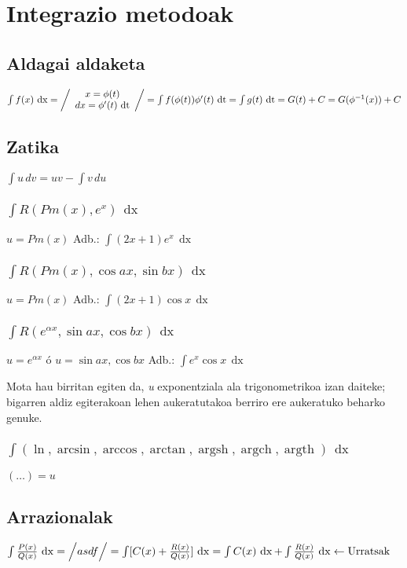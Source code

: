 \documentclass[8pt]{article}
\DeclareMathOperator{\xder}{\, \mathrm{d}x}
\DeclareMathOperator{\tder}{\, \mathrm{d}t}
\DeclareMathOperator{\argsh}{argsh}
\DeclareMathOperator{\argch}{argch}
\DeclareMathOperator{\argth}{argth}
\begin{document}
	\section{Integrazio metodoak}
		\subsection{Aldagai aldaketa}
			$ \int f(x) \xder = \left/
				\begin{array}{c}
					x = \phi (t) \\
					dx = \phi'(t) \tder
				\end{array}
				\right/
				= \int f(\phi(t)) \phi' (t) \tder =
				\int g(t) \tder = G (t) + C = G (\phi^{-1} (x)) + C
			$
		\subsection{Zatika}
			$ \int u \, dv = uv - \int v \, du $

			\subsubsection{$ \int R (Pm(x), e^x) \xder$}
				$ u = Pm(x) $ \quad 
				Adb.: $ \int (2x + 1) e^x \xder $
			\subsubsection{$ \int R (Pm(x), \cos ax, \sin bx) \xder $}
				$ u = Pm(x) $ \quad
				Adb.: $ \int (2x + 1) \cos x \xder $
			\subsubsection{$ \int R (e^{\alpha x}, \sin ax, \cos bx) \xder $}
				$ u = e^{\alpha x} $ ó $ u = \sin ax, \cos bx $ \quad
				Adb.: $ \int e^x \cos x \xder $

				Mota hau birritan egiten da, \textit{u} exponentziala ala
				trigonometrikoa izan daiteke; bigarren aldiz egiterakoan
				lehen aukeratutakoa berriro ere aukeratuko beharko genuke.

			\subsubsection{$ \int (\ln, \arcsin, \arccos, \arctan, \argsh, \argch, \argth ) \xder $}
				$ ( \dots ) = u $
		\subsection{Arrazionalak}
			$ \int \frac{P(x)}{Q(x)} \xder =
				\Big{/}
					asdf
				\Big{/}
				= \int [ C(x) + \frac{R(x)}{Q(x)} ] \xder =
				\int C(x) \xder + \int \frac{R(x)}{Q(x)} \xder \leftarrow \text{Urratsak} $
\end{document}
